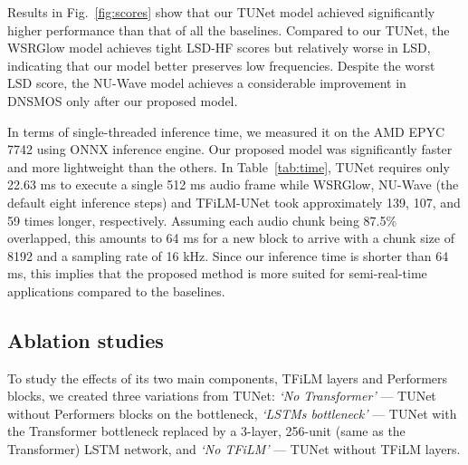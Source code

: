 \documentclass{article}
\begin{document}
Results in Fig.~\ref{fig:scores} show that our TUNet model achieved significantly higher performance than that of all the baselines.
Compared to our TUNet, the WSRGlow model achieves tight LSD-HF scores but relatively worse in LSD, indicating that our model better preserves low frequencies. Despite the worst LSD score, the NU-Wave model achieves a considerable improvement in DNSMOS only after our proposed model.
\begin{table}
\caption{Model size and inference time on a single core CPU.}
\centering
{}

\label{tab:time}
\end{table}

In terms of single-threaded inference time, we measured it on the AMD EPYC 7742 using ONNX inference engine. Our proposed model was significantly faster and more lightweight than the others. In Table~\ref{tab:time}, TUNet requires only 22.63 ms to execute a single 512 ms audio frame while WSRGlow, NU-Wave (the default eight inference steps) and TFiLM-UNet took approximately 139, 107, and 59 times longer, respectively. Assuming each audio chunk being 87.5\% overlapped, this amounts to 64 ms for a new block to arrive with a chunk size of 8192 and a sampling rate of 16 kHz.  Since our inference time is shorter than 64 ms, this implies that the proposed method is more suited for semi-real-time applications compared to the baselines. 
\vspace{-0.35cm}


\subsection{Ablation studies}
\vspace{-0.2cm}
To study the effects of its two main components, TFiLM layers and Performers blocks, we created three variations from TUNet: \textit{`No Transformer'} --- TUNet without Performers blocks on the bottleneck, \textit{`LSTMs bottleneck'} --- TUNet with the Transformer bottleneck replaced by a 3-layer, 256-unit (same as the Transformer) LSTM network, and \textit{`No TFiLM'} --- TUNet without TFiLM layers.
\end{document}
